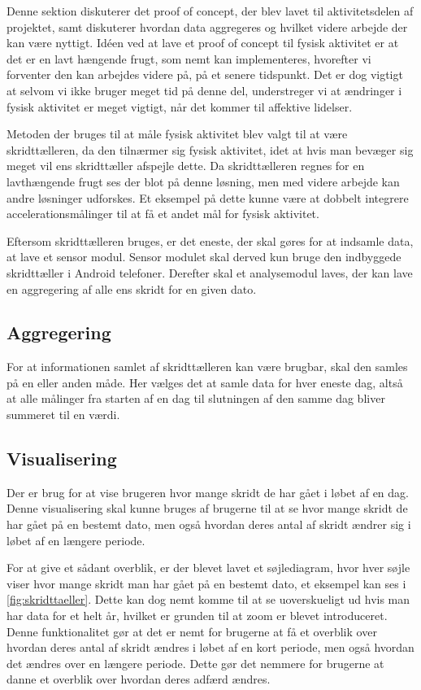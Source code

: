 Denne sektion diskuterer det proof of concept, der blev lavet til aktivitetsdelen af projektet, samt diskuterer hvordan data aggregeres og hvilket videre arbejde der kan være nyttigt. 
Idéen ved at lave et proof of concept til fysisk aktivitet er at det er en lavt hængende frugt, som nemt kan implementeres, hvorefter vi forventer den kan arbejdes videre på, på et senere tidspunkt. 
Det er dog vigtigt at selvom vi ikke bruger meget tid på denne del, understreger vi at ændringer i fysisk aktivitet er meget vigtigt, når det kommer til affektive lidelser. 

Metoden der bruges til at måle fysisk aktivitet blev valgt til at være skridttælleren, da den tilnærmer sig fysisk aktivitet, idet at hvis man bevæger sig meget vil ens skridttæller afspejle dette.
Da skridttælleren regnes for en lavthængende frugt ses der blot på denne løsning, men med videre arbejde kan andre løsninger udforskes.
Et eksempel på dette kunne være at dobbelt integrere accelerationsmålinger til at få et andet mål for fysisk aktivitet.

Eftersom skridttælleren bruges, er det eneste, der skal gøres for at indsamle data, at lave et sensor modul.
Sensor modulet skal derved kun bruge den indbyggede skridttæller i Android telefoner.
Derefter skal et analysemodul laves, der kan lave en aggregering af alle ens skridt for en given dato.

\subsection{Aggregering}
For at informationen samlet af skridttælleren kan være brugbar, skal den samles på en eller anden måde.
Her vælges det at samle data for hver eneste dag, altså at alle målinger fra starten af en dag til slutningen af den samme dag bliver summeret til en værdi.

\subsection{Visualisering}\label{sec:aktivitetVis}
Der er brug for at vise brugeren hvor mange skridt de har gået i løbet af en dag.
Denne visualisering skal kunne bruges af brugerne til at se hvor mange skridt de har gået på en bestemt dato, men også hvordan deres antal af skridt ændrer sig i løbet af en længere periode.

For at give et sådant overblik, er der blevet lavet et søjlediagram, hvor hver søjle viser hvor mange skridt man har gået på en bestemt dato, et eksempel kan ses i \cref{fig:skridttaeller}.
Dette kan dog nemt komme til at se uoverskueligt ud hvis man har data for et helt år, hvilket er grunden til at zoom er blevet introduceret.
Denne funktionalitet gør at det er nemt for brugerne at få et overblik over hvordan deres antal af skridt ændres i løbet af en kort periode, men også hvordan det ændres over en længere periode.
Dette gør det nemmere for brugerne at danne et overblik over hvordan deres adfærd ændres.

